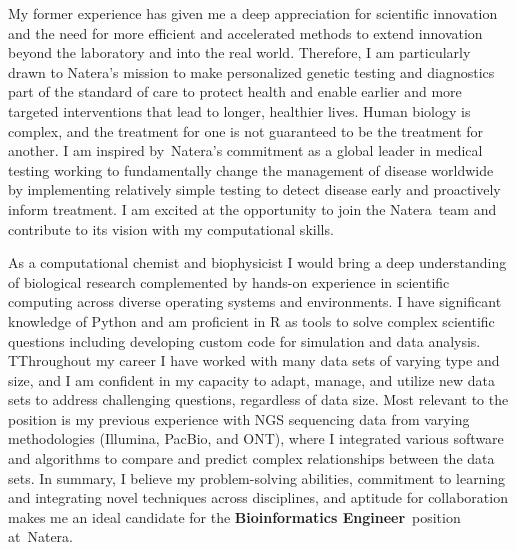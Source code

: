 \documentclass[11pt, a4paper]{awesome-cv}
\newcommand{\companyname}{Natera}
\newcommand{\role}{Bioinformatics Engineer}
\newcommand{\brole}{\textbf{\role}}
\begin{document}
\begin{cvletter}
				
		\lettersection{Why \companyname?}
		My former experience has given me a deep appreciation for scientific innovation and the need for more efficient and accelerated methods to extend innovation beyond the laboratory and into the real world. 	
		Therefore, I am particularly drawn to \companyname's mission to make personalized genetic testing and diagnostics part of the standard of care to protect health and enable earlier and more targeted interventions that lead to longer, healthier lives.
		Human biology is complex, and the treatment for one is not guaranteed to be the treatment for another.
		I am inspired by~\companyname's commitment as a global leader in medical testing working to fundamentally change the management of disease worldwide by implementing relatively simple testing to detect disease early and proactively inform treatment.		
		I am excited at the opportunity to join the \companyname~team and contribute to its vision with my computational skills.
				
		
		As a computational chemist and biophysicist I would bring a deep understanding of biological research complemented by hands-on experience in scientific computing across diverse operating systems and environments. %
		I have significant knowledge of Python and am proficient in R as tools to solve complex scientific questions including developing custom code for simulation and data analysis.
		TThroughout my career I have worked with many data sets of varying type and size, and I am confident in my capacity to adapt, manage, and utilize new data sets  to address challenging questions, regardless of data size.
		Most relevant to the position is my previous experience with NGS sequencing data from varying methodologies (Illumina, PacBio, and ONT), where I integrated various software and algorithms to compare and predict complex relationships between the data sets. 
		In summary, I believe my problem-solving abilities, commitment to learning and integrating novel techniques across disciplines, and aptitude for collaboration makes me an ideal candidate for the \brole~position at~\companyname.
		
	\end{cvletter}
\end{document}
